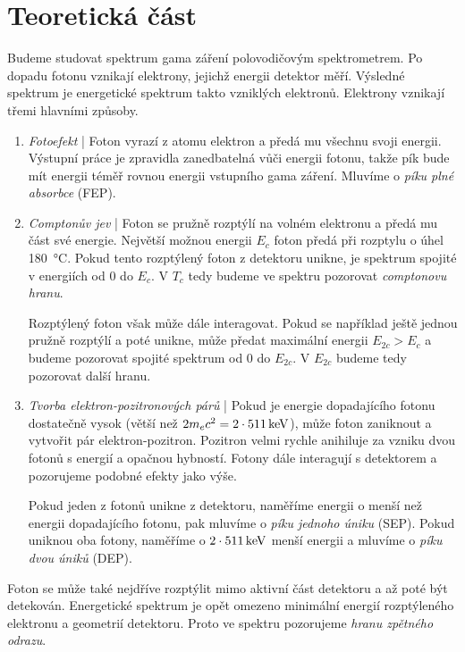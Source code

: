 \section*{Teoretická část}
Budeme studovat spektrum gama záření polovodičovým spektrometrem. Po dopadu fotonu vznikají elektrony, jejichž energii detektor měří. Výsledné spektrum je energetické spektrum takto vzniklých elektronů.
Elektrony vznikají třemi hlavními způsoby.
\begin{enumerate}
\item \emph{Fotoefekt}\cite{skripta} |
Foton vyrazí z atomu elektron a předá mu všechnu svoji energii. Výstupní práce je zpravidla zanedbatelná vůči energii fotonu, takže pík bude mít energii téměř rovnou energii vstupního gama záření. Mluvíme o \emph{píku plné absorbce} (FEP).
\item \emph{Comptonův jev}\cite{skripta} | Foton se pružně rozptýlí na volném elektronu a předá mu část své energie. Největší možnou energii $E_c$ foton předá při rozptylu o úhel \SI{180}{\degreeCelsius}. Pokud tento rozptýlený foton z detektoru unikne, je spektrum spojité v energiích od 0 do $E_c$. V $T_c$ tedy budeme ve spektru pozorovat \emph{comptonovu hranu}.

Rozptýlený foton však může dále interagovat. Pokud se například ještě jednou pružně rozptýlí a poté unikne, může předat maximální energii $E_{2c}>E_c$ a budeme pozorovat spojité spektrum od 0 do $E_{2c}$. V $E_{2c}$ budeme tedy pozorovat další hranu.
\item \emph{Tvorba elektron-pozitronových párů}\cite{skripta} | Pokud je energie dopadajícího fotonu dostatečně vysok (větší než $2m_ec^2=2\cdot\kev{511}$), může foton zaniknout a vytvořit pár elektron-pozitron. Pozitron velmi rychle anihiluje za vzniku dvou fotonů s energií  a opačnou hybností. Fotony dále interagují s detektorem a pozorujeme podobné efekty jako výše.

Pokud jeden z fotonů unikne z detektoru, naměříme energii o  menší než energii dopadajícího fotonu, pak mluvíme o \emph{píku jednoho úniku} (SEP). Pokud uniknou oba fotony, naměříme o $2\cdot \kev{511}$ menší energii a mluvíme o \emph{píku dvou úniků} (DEP).
\end{enumerate}

Foton se může také nejdříve rozptýlit mimo aktivní část detektoru a až poté být detekován. Energetické spektrum je opět omezeno minimální energií rozptýleného elektronu a geometrií detektoru. Proto ve spektru pozorujeme \emph{hranu zpětného odrazu}.

